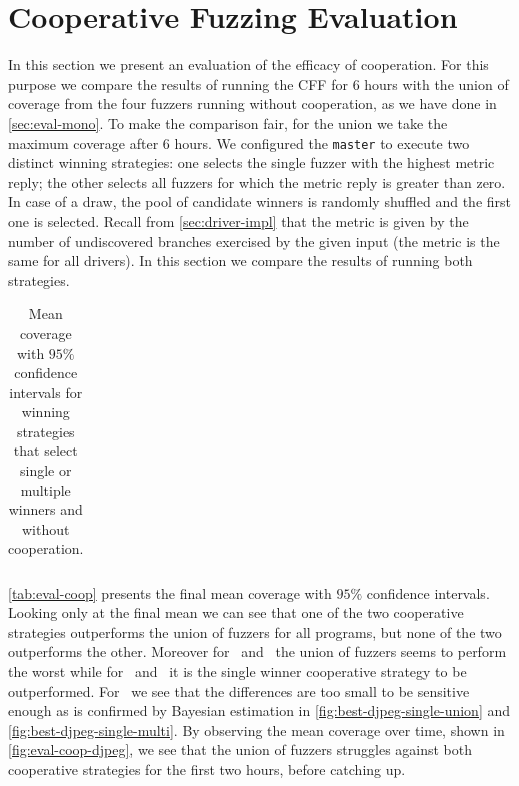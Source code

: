 \section{Cooperative Fuzzing Evaluation}
\label{sec:eval-coop}

In this section we present an evaluation of the efficacy of cooperation. For
this purpose we compare the results of running the \ac{CFF} for $6$ hours with
the union of coverage from the four fuzzers running without cooperation, as we
have done in \autoref{sec:eval-mono}. To make the comparison fair, for the union
we take the maximum coverage after $6$ hours. We configured the \texttt{master}
to execute two distinct winning strategies: one selects the single fuzzer with
the highest metric reply; the other selects all fuzzers for which the metric
reply is greater than zero. In case of a draw, the pool of candidate winners is
randomly shuffled and the first one is selected. Recall from
\autoref{sec:driver-impl} that the metric is given by the number of undiscovered
branches exercised by the given input (the metric is the same for all drivers).
In this section we compare the results of running both strategies.

\begin{table}[h]
    \centering%
    \begin{tabular}{l c c c}
        
    \end{tabular}
    \caption{Mean coverage with $95\%$ confidence intervals for winning
    strategies that select single or multiple winners and without cooperation.}
    \label{tab:eval-coop}
\end{table}

\autoref{tab:eval-coop} presents the final mean coverage with $95\%$ confidence
intervals. Looking only at the final mean we can see that one of the two
cooperative strategies outperforms the union of fuzzers for all programs, but
none of the two outperforms the other. Moreover for \djpeg\ and \objdump\ the
union of fuzzers seems to perform the worst while for \tiffpdf\ and \listswf\ it
is the single winner cooperative strategy to be outperformed. For \djpeg\ we see
that the differences are too small to be sensitive enough as is confirmed by
Bayesian estimation in \autoref{fig:best-djpeg-single-union} and
\autoref{fig:best-djpeg-single-multi}. By observing the mean coverage over time,
shown in \autoref{fig:eval-coop-djpeg}, we see that the union of fuzzers
struggles against both cooperative strategies for the first two hours, before
catching up.


